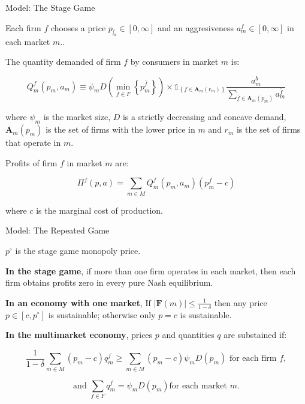 \documentclass[notes,10.2pt, aspectratio=169]{beamer}
\newenvironment{wideitemize}{\itemize\addtolength{\itemsep}{10pt}}{\enditemize}
\begin{document}
\begin{frame}{Model: The Stage Game}

  \begin{wideitemize}

\item Each firm $f$ chooses a price $p_^f_m \in [0, \infty]$ and an aggresiveness $a^f_m \in [0, \infty]$ in each market $m$..
\item The quantity demanded of firm $f$  by consumers in market $m$  is:

$$Q_m^f\left(p_m, a_m\right) \equiv \psi_m D\left(\min _{\bar{f} \in F}\left\{p_m^{\bar{f}}\right\}\right) \times \mathbb{1}_{\left\{f \in \mathbf{A}_m\left(r_m\right)\right\}} \frac{a_m^b}{\sum_{\bar{f} \in \mathbf{A}_m\left(p_m\right)} a_m^{\bar{f}}}$$

where $\psi_m$ is the market size, $D$ is a strictly decreasing and concave demand, $\mathbf{A}_m\left(p_m\right)$ is the set of firms with the lower price in $m$ and $r_m$ is the set of firms that operate in $m$.

\pause 

\item Profits of firm $f$ in market $m$ are:

$$\Pi^f\left(p, a\right)= \sum_{m \in M}  Q_m^f\left(p_m, a_m\right) (p_m^f -c)$$

where $c$ is the marginal cost of production.
\end{wideitemize}
  

\end{frame}


\begin{frame}{Model: The Repeated Game}

  \begin{wideitemize}

  \item $p^{\circ}$ is the stage game monopoly price.
  \item \textbf{In the stage game}, if more than one firm operates in each market, then each firm obtains profits zero in every pure Nash equilibrium.
  \item \textbf{In an economy with one market}, If $|\mathbf{F}(m)| \leq \frac{1}{1-\delta}$ then any price $p \in\left[c, p^{\circ}\right]$ is sustainable; otherwise only $p=c$ is sustainable.
  
  \item \textbf{In the multimarket economy},  prices $p$ and quantities $q$ are substained if: 

$$
\frac{1}{1-\delta} \sum_{m \in M}\left(p_m-c\right) q_m^f \geq \sum_{m \in M}\left(p_m-c\right) \psi_m D\left(p_m\right) \text{ for each firm $f$}, 
$$

$$
\text{and } \sum_{f \in F} q_m^f=\psi_m D\left(p_m\right) \text{for each market $m$}.
$$

\end{wideitemize}
  

\end{frame}
\end{document}
